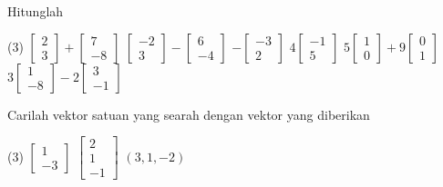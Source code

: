 \begin{exercise}
\pagebreak[2]
Hitunglah
\begin{tasks}(3)
\task
$\begin{bmatrix}
2 \\
3
\end{bmatrix}
+
\begin{bmatrix}
7 \\
-8
\end{bmatrix}
$
\task
$\begin{bmatrix}
-2 \\
3
\end{bmatrix}
-
\begin{bmatrix}
6 \\
-4
\end{bmatrix}
$
\task
$
-\begin{bmatrix}
-3 \\
2
\end{bmatrix}
$
\task
$
4\begin{bmatrix}
-1 \\
5
\end{bmatrix}
$
\task
$
5\begin{bmatrix}
1 \\
0
\end{bmatrix}
+
9
\begin{bmatrix}
0 \\
1
\end{bmatrix}
$
\task
$
3\begin{bmatrix}
1 \\
-8
\end{bmatrix}
-
2
\begin{bmatrix}
3 \\
-1
\end{bmatrix}
$
\end{tasks}
\end{exercise}

\begin{exercise}
Carilah vektor satuan yang searah dengan vektor yang diberikan
\begin{tasks}(3)
\task
$\begin{bmatrix}
1 \\
-3
\end{bmatrix}
$
\task
$\begin{bmatrix}
2 \\
1 \\
-1
\end{bmatrix}
$
\task
$(3,1,-2)$
\end{tasks}
\end{exercise}

